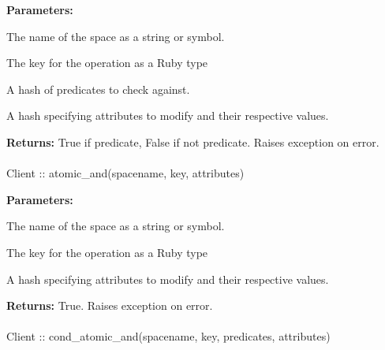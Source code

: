 \noindent\textbf{Parameters:}
\begin{description}[labelindent=\widthof{{\code{predicates}}},leftmargin=*,noitemsep,nolistsep,align=right]
\item[\code{spacename}] The name of the space as a string or symbol.
\item[\code{key}] The key for the operation as a Ruby type
\item[\code{predicates}] A hash of predicates to check against.
\item[\code{attributes}] A hash specifying attributes to modify and their respective values.
\end{description}

\noindent\textbf{Returns:}
True if predicate, False if not predicate.  Raises exception on error.

\paragraph{}
\label{api:ruby:atomic_and}
\begin{ccode}
Client :: atomic_and(spacename, key, attributes)
\end{ccode}
\funcdesc 

\noindent\textbf{Parameters:}
\begin{description}[labelindent=\widthof{{\code{attributes}}},leftmargin=*,noitemsep,nolistsep,align=right]
\item[\code{spacename}] The name of the space as a string or symbol.
\item[\code{key}] The key for the operation as a Ruby type
\item[\code{attributes}] A hash specifying attributes to modify and their respective values.
\end{description}

\noindent\textbf{Returns:}
True.  Raises exception on error.

\paragraph{}
\label{api:ruby:cond_atomic_and}
\begin{ccode}
Client :: cond_atomic_and(spacename, key, predicates, attributes)
\end{ccode}
\funcdesc 

